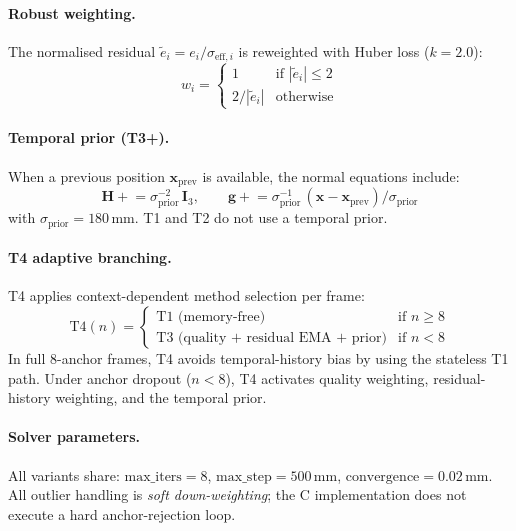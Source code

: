 \documentclass[11pt,a4paper]{article}
\begin{document}
\paragraph{Robust weighting.}
The normalised residual $\tilde{e}_i = e_i / \sigma_{\mathrm{eff},i}$ is reweighted with Huber loss ($k = 2.0$):
\begin{equation}
  w_i = \begin{cases} 1 & \text{if } |\tilde{e}_i| \leq 2 \\ 2 / |\tilde{e}_i| & \text{otherwise} \end{cases}
\end{equation}

\paragraph{Temporal prior (T3+).}
When a previous position $\mathbf{x}_{\mathrm{prev}}$ is available, the normal equations include:
\begin{equation}
  \mathbf{H} \mathrel{+}= \sigma_{\mathrm{prior}}^{-2}\,\mathbf{I}_3, \qquad
  \mathbf{g} \mathrel{+}= \sigma_{\mathrm{prior}}^{-1}\,(\mathbf{x} - \mathbf{x}_{\mathrm{prev}}) / \sigma_{\mathrm{prior}}
\end{equation}
with $\sigma_{\mathrm{prior}} = 180$\,mm. T1 and T2 do not use a temporal prior.

\paragraph{T4 adaptive branching.}
T4 applies context-dependent method selection per frame:
\begin{equation}
  \text{T4}(n) = \begin{cases}
    \text{T1 (memory-free)} & \text{if } n \geq 8 \\
    \text{T3 (quality + residual EMA + prior)} & \text{if } n < 8
  \end{cases}
\end{equation}
In full 8-anchor frames, T4 avoids temporal-history bias by using the stateless T1 path.
Under anchor dropout ($n < 8$), T4 activates quality weighting, residual-history weighting, and the temporal prior.

\paragraph{Solver parameters.}
All variants share: $\mathrm{max\_iters} = 8$, $\mathrm{max\_step} = 500$\,mm, $\mathrm{convergence} = 0.02$\,mm.
All outlier handling is \emph{soft down-weighting}; the C implementation does not execute a hard anchor-rejection loop.
\end{document}
